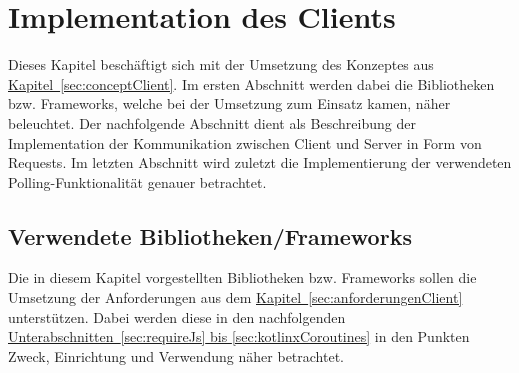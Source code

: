 
\chapter{Implementation des Clients}
Dieses Kapitel beschäftigt sich mit der Umsetzung des Konzeptes aus \hyperref[sec:conceptClient]{Kapitel~\ref{sec:conceptClient}}. Im ersten Abschnitt werden dabei die Bibliotheken bzw. Frameworks, welche bei der Umsetzung zum Einsatz kamen, näher beleuchtet. Der nachfolgende Abschnitt dient als Beschreibung der Implementation der Kommunikation zwischen Client und Server in Form von Requests. Im letzten Abschnitt wird zuletzt die Implementierung der verwendeten Polling-Funktionalität genauer betrachtet.

\section{Verwendete Bibliotheken/Frameworks}
Die in diesem Kapitel vorgestellten Bibliotheken bzw. Frameworks sollen die Umsetzung der Anforderungen aus dem \hyperref[sec:anforderungenClient]{Kapitel~\ref{sec:anforderungenClient}} unterstützen. Dabei werden diese in den nachfolgenden \hyperref[sec:requireJs, sec:kotlinxCoroutines]{Unterabschnitten~\ref{sec:requireJs} bis \ref{sec:kotlinxCoroutines}} in den Punkten Zweck, Einrichtung und Verwendung näher betrachtet.


